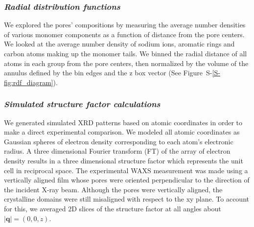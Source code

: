 \documentclass[journal=jpcbfk,manuscript=article]{achemso}
\begin{document}




  \subsubsection{\textit{Radial distribution functions}}

  We explored the pores' compositions by measuring the average number densities
  of various monomer components as a function of distance from the pore centers.
  We looked at the average number density of sodium ions, aromatic rings and 
  carbon atoms making up the monomer tails. We binned the radial distance of all
  atoms in each group from the pore centers, then normalized by the volume of the
  annulus defined by the bin edges and the z box vector (See Figure~S-\ref{S-fig:rdf_diagram}). 

  \subsubsection{\textit{Simulated structure factor calculations}}\label{method:xrd}
  
  We generated simulated XRD patterns based on atomic coordinates in order to make
  a direct experimental comparison. We modeled all atomic coordinates as Gaussian
  spheres of electron density corresponding to each atom's electronic radius. A 
  three dimensional Fourier transform (FT) of the array of electron density results in a three dimensional
  structure factor which represents the unit cell in reciprocal space. The
  experimental WAXS measurement was made using a vertically aligned film whose 
  pores were oriented perpendicular to the direction of the incident X-ray beam. 
  Although the pores were vertically aligned, the crystalline domains were still
  misaligned with respect to the xy plane. To account for this, we averaged
  2D slices of the structure factor at all angles about $|\mathbf{q}| = (0, 0, z)$. 
\end{document}
